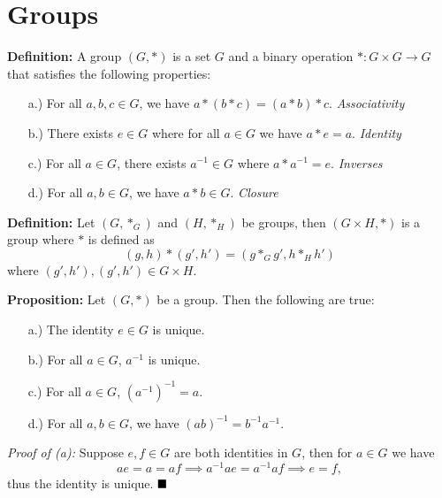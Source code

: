 \documentclass[12pt]{article}
\newcommand{\parenb}[1]{\left(#1\right)}
\newcommand{\done}{\ensuremath{\strut\hfill\blacksquare}}
\begin{document}
\pagestyle{fancy}

\setlength{\parindent}{0in}
\setlength{\parskip}{0.1in}

\section*{Groups}

\textbf{Definition:} A group \( (G, *) \) is a set \( G \) and a binary
operation \( * : G \times G \to G \) that satisfies the following properties:

\begin{itemize}
	\item[a.)] For all \( a,b,c \in G \), we have
		\( a * (b * c) = (a * b) * c \).
		\hfill \textit{Associativity}

	\item[b.)] There exists \( e \in G \) where for all \( a \in G \) we have
		\( a * e = a \).
		\hfill \textit{Identity}

	\item[c.)] For all \( a \in G \), there exists \( a^{-1} \in G \) where
		\( a * a^{-1} = e \).
		\hfill \textit{Inverses}

	\item[d.)] For all \( a,b \in G \), we have \( a * b \in G \).
		\hfill \textit{Closure}
\end{itemize}

\textbf{Definition:} Let \( (G, *_G) \) and \( (H, *_H) \) be groups, then
\( (G \times H, *) \) is a group where \( * \) is defined as
\[
	(g, h) * (g', h') = (g *_G g', h *_H h')
\]
where \( (g', h'),(g', h') \in G \times H \).

\textbf{Proposition:} Let \( (G, *) \) be a group. Then the following are true:

\begin{itemize}
	\item[a.)] The identity \( e \in G \) is unique.

	\item[b.)] For all \( a \in G \), \( a^{-1} \) is unique.

	\item[c.)] For all \( a \in G \), \( \parenb{a^{-1}}^{-1} = a \).

	\item[d.)] For all \( a,b \in G \), we have \( (ab)^{-1} = b^{-1}a^{-1} \).
\end{itemize}

\textit{Proof of (a):} Suppose \( e,f \in G \) are both identities in \( G \),
then for \( a \in G \) we have
\[
	ae = a = af \implies a^{-1}ae = a^{-1}af \implies e = f,
\]
thus the identity is unique.
\done
\end{document}
